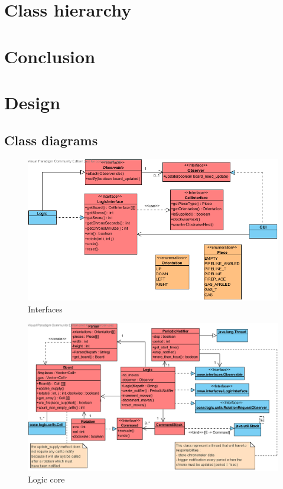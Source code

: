 \documentclass[a4paper,11pt]{article}
\begin{document}
\section{Class hierarchy}
\label{sec:cls_hier}
\section{Conclusion}
\appendix
\section{Design}
\subsection{Class diagrams}
\begin{figure}[h]
	\center
	\includegraphics[angle=90,scale=1]{interfaces.png}
	\caption{Interfaces}
	\label{fig:inter}
\end{figure}
\begin{figure}[h]
	\center
	\includegraphics[angle=90,scale=1]{logic.png}
	\caption{Logic core}
	\label{fig:logic}
\end{figure}
\end{document}
